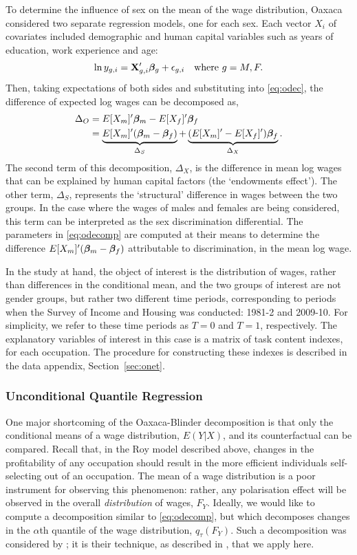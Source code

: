 To determine the influence of sex on the mean of the wage distribution, Oaxaca considered two separate regression models, one for each sex. Each vector $X_i$ of covariates included demographic and human capital variables such as years of education, work experience and age:
$$  \ln y_{g,i} = \mathbf{X}_{g,i}'\boldsymbol{\beta}_g + \epsilon_{g,i} \quad \text{where}\ g=M,F. $$
Then, taking expectations of both sides and substituting into \eqref{eq:odec}, the difference of expected log wages can be decomposed as,
\begin{align}
  \Delta_O &= E[X_m]'\boldsymbol{\beta}_m -  E[X_f]'\boldsymbol{\beta}_f \notag \\
  &= \underbrace{E[X_m]'(\boldsymbol{\beta}_m - \boldsymbol{\beta}_f)}_{\Delta_S} + \underbrace{(E[X_m]'-E[X_f]')\boldsymbol{\beta}_f}_{\Delta_X}. \label{eq:odecomp}
\end{align}
The second term of this decomposition, $\Delta_X$, is the difference in mean log wages that can be explained by human capital factors (the `endowments effect'). The other term, $\Delta_S$, represents the `structural' difference in wages between the two groups. In the case where the wages of males and females are being considered, this term can be interpreted as the sex discrimination differential. The parameters in \eqref{eq:odecomp} are computed at their means to determine the difference $E[X_m]'(\boldsymbol{\beta}_m - \boldsymbol{\beta}_f)$ attributable to discrimination, in the mean log wage.

In the study at hand, the object of interest is the distribution of wages, rather than differences in the conditional mean, and the two groups of interest are not gender groups, but rather two different time periods, corresponding to periods when the Survey of Income and Housing was conducted: 1981-2 and 2009-10. For simplicity, we refer to these time periods as $T=0$ and $T=1$, respectively. The explanatory variables of interest in this case is a matrix of task content indexes, for each occupation. The procedure for constructing these indexes is described in the data appendix, Section~\ref{sec:onet}.

\subsubsection{Unconditional Quantile Regression}
One major shortcoming of the Oaxaca-Blinder decomposition is that only the conditional means of a wage distribution, $E(Y|X)$, and its counterfactual can be compared. Recall that, in the Roy model described above, changes in the profitability of any occupation should result in the more efficient individuals self-selecting out of an occupation. The mean of a wage distribution is a poor instrument for observing this phenomenon: rather, any polarisation effect will be observed in the overall {\em distribution} of wages, $F_Y$. Ideally, we would like to compute a decomposition similar to \eqref{eq:odecomp}, but which decomposes changes in the $\alpha$th quantile of the wage distribution, $q_\tau(F_Y)$. Such a decomposition was considered by \citet{Firpo2011}; it is their technique, as described in \citet{Firpo2009}, that we apply here.

